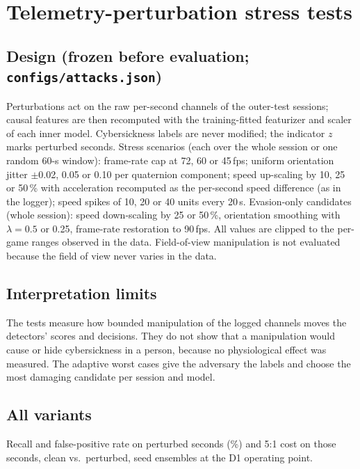 \section{Telemetry-perturbation stress tests}
\label{sec:s-attacks}

\subsection{Design (frozen before evaluation; \texttt{configs/\allowbreak attacks.json})}
Perturbations act on the raw per-second channels of the outer-test sessions; causal features are then recomputed with the training-fitted featurizer and scaler of each inner model. Cybersickness labels are never modified; the indicator $z$ marks perturbed seconds. Stress scenarios (each over the whole session or one random 60-s window): frame-rate cap at 72, 60 or 45\,fps; uniform orientation jitter $\pm$0.02, 0.05 or 0.10 per quaternion component; speed up-scaling by 10, 25 or 50\,\% with acceleration recomputed as the per-second speed difference (as in the logger); speed spikes of 10, 20 or 40 units every 20\,s. Evasion-only candidates (whole session): speed down-scaling by 25 or 50\,\%, orientation smoothing with $\lambda=0.5$ or 0.25, frame-rate restoration to 90\,fps. All values are clipped to the per-game ranges observed in the data. Field-of-view manipulation is not evaluated because the field of view never varies in the data.

\subsection{Interpretation limits}
The tests measure how bounded manipulation of the logged channels moves the detectors' scores and decisions. They do not show that a manipulation would cause or hide cybersickness in a person, because no physiological effect was measured. The adaptive worst cases give the adversary the labels and choose the most damaging candidate per session and model.

\subsection{All variants}
Recall and false-positive rate on perturbed seconds (\%) and 5:1 cost on those seconds, clean vs.\ perturbed, seed ensembles at the D1 operating point.

{\scriptsize\setlength{\tabcolsep}{2.5pt}}
